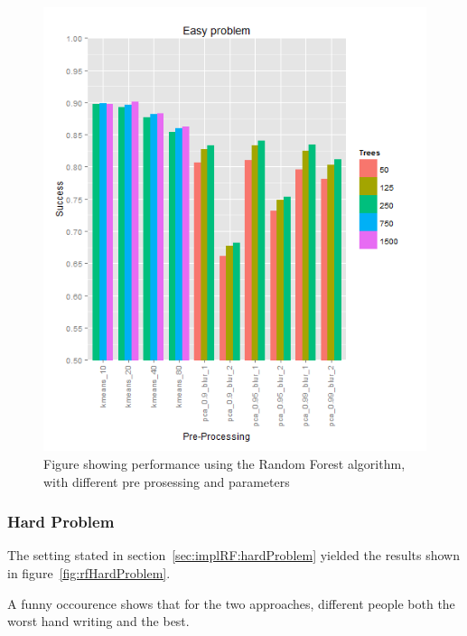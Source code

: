 \documentclass[report]{subfiles}
\begin{document}
\begin{figure}[H]
  \centering
  \includegraphics[width=1\textwidth]{images/rf_easy}
  \caption{Figure showing performance using the Random Forest algorithm, with different pre prosessing and parameters}
  \label{fig:rfEasyProblem}
\end{figure}

\subsubsection{Hard Problem}
\label{sec:resultRandomForest:HardProblem}

The setting stated in section~\ref{sec:implRF:hardProblem} yielded the results shown in figure~\ref{fig:rfHardProblem}. 

A funny occourence shows that for the two approaches, different people both the worst hand writing and the best.
\end{document}
